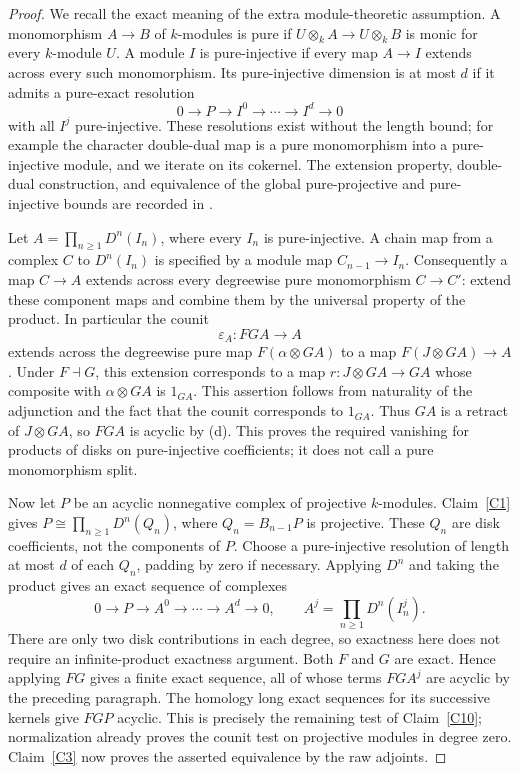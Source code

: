 \begin{proof}
We recall the exact meaning of the extra module-theoretic assumption. A monomorphism $A\to B$ of $k$-modules is pure if $U\otimes_k A\to U\otimes_k B$ is monic for every $k$-module $U$. A module $I$ is pure-injective if every map $A\to I$ extends across every such monomorphism. Its pure-injective dimension is at most $d$ if it admits a pure-exact resolution
\[
 0\longrightarrow P\longrightarrow I^0\longrightarrow\cdots
 \longrightarrow I^d\longrightarrow0
\]
with all $I^j$ pure-injective. These resolutions exist without the length bound; for example the character double-dual map is a pure monomorphism into a pure-injective module, and we iterate on its cokernel. The extension property, double-dual construction, and equivalence of the global pure-projective and pure-injective bounds are recorded in \citet[Sections 2.3--2.5]{BensonGnacadja1999}.

Let $A=\prod_{n\geq1}D^n(I_n)$, where every $I_n$ is pure-injective. A chain map from a complex $C$ to $D^n(I_n)$ is specified by a module map $C_{n-1}\to I_n$. Consequently a map $C\to A$ extends across every degreewise pure monomorphism $C\to C'$: extend these component maps and combine them by the universal property of the product. In particular the counit
\[
 \varepsilon_A:FGA\longrightarrow A
\]
extends across the degreewise pure map $F(\alpha\otimes GA)$ to a map $F(J\otimes GA)\to A$. Under $F\dashv G$, this extension corresponds to a map $r:J\otimes GA\to GA$ whose composite with $\alpha\otimes GA$ is $1_{GA}$. This assertion follows from naturality of the adjunction and the fact that the counit corresponds to $1_{GA}$. Thus $GA$ is a retract of $J\otimes GA$, so $FGA$ is acyclic by (d). This proves the required vanishing for products of disks on pure-injective coefficients; it does not call a pure monomorphism split.

Now let $P$ be an acyclic nonnegative complex of projective $k$-modules. Claim~\ref{C1} gives $P\cong\prod_{n\geq1}D^n(Q_n)$, where $Q_n=B_{n-1}P$ is projective. These $Q_n$ are disk coefficients, not the components of $P$. Choose a pure-injective resolution of length at most $d$ of each $Q_n$, padding by zero if necessary. Applying $D^n$ and taking the product gives an exact sequence of complexes
\[
 0\longrightarrow P\longrightarrow A^0\longrightarrow\cdots
 \longrightarrow A^d\longrightarrow0,
 \qquad A^j=\prod_{n\geq1}D^n(I_n^j).
\]
There are only two disk contributions in each degree, so exactness here does not require an infinite-product exactness argument. Both $F$ and $G$ are exact. Hence applying $FG$ gives a finite exact sequence, all of whose terms $FGA^j$ are acyclic by the preceding paragraph. The homology long exact sequences for its successive kernels give $FGP$ acyclic. This is precisely the remaining test of Claim~\ref{C10}; normalization already proves the counit test on projective modules in degree zero. Claim~\ref{C3} now proves the asserted equivalence by the raw adjoints.


\end{proof}
